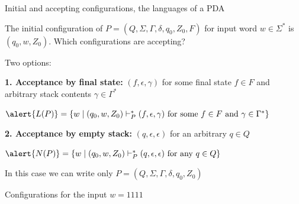 \documentclass[handout]{beamer}
\begin{document}
\begin{frame}{Initial and accepting configurations, the languages of a PDA}

    The \alert{initial configuration} of $P=(Q,\Sigma,\Gamma,\delta,q_0,Z_0,F)$ for input word $w\in\Sigma^*$ is \alert{$(q_0,w,Z_0)$}. Which configurations are \alert{accepting}? 
    
    Two options:

    \textbf{1. Acceptance by final state:} \alert{$(f,\epsilon,\gamma)$} for some final state $f\in F$ and arbitrary stack contents $\gamma\in\Gamma^*$


    $\alert{L(P)}=\{w\mid (q_0,w,Z_0)\vdash^*_P (f,\epsilon,\gamma)\text{ for some }f\in F\text{ and }\gamma\in\Gamma^*\}$

    \bigskip

    \textbf{2. Acceptance by empty stack:} \alert{$(q,\epsilon,\epsilon)$} for an arbitrary $q\in Q$

    $\alert{N(P)}=\{w\mid (q_0,w,Z_0)\vdash^*_P (q,\epsilon,\epsilon)\text{ for any }q\in Q\}$

    \medskip

    In this case we can write only $P=(Q,\Sigma,\Gamma,\delta,q_0,Z_0)$    

\end{frame}


\begin{frame}{Configurations for the input $w=1111$}

    \begin{center}
    \end{center}

\end{frame}
\end{document}
